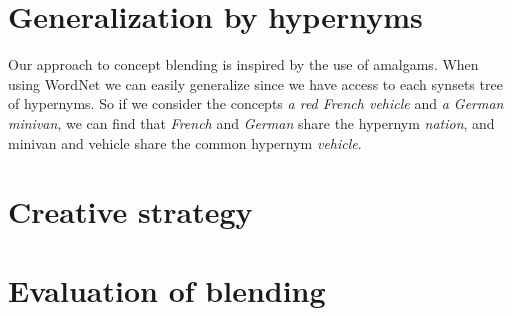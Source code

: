 
\section{Generalization by hypernyms}
Our approach to concept blending is inspired by the use of amalgams. When using WordNet we can easily generalize since we have access to each synsets tree of hypernyms. So if we consider the concepts \emph{a red French vehicle} and \emph{a German minivan}, we can find that \emph{French} and \emph{German} share the hypernym \emph{nation}, and minivan and vehicle share the common hypernym \emph{vehicle}.


\section{Creative strategy}


\section{Evaluation of blending}

